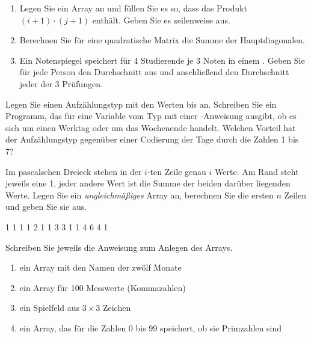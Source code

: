 \begin{enumerate}[label=\alph*)]
\item Legen Sie ein Array  an und füllen Sie es so, dass  das Produkt $(i+1) \cdot (j+1)$ enthält. Geben Sie es zeilenweise aus.
\item Berechnen Sie für eine quadratische Matrix die Summe der Hauptdiagonalen.
\item Ein Notenspiegel speichert für 4 Studierende je 3 Noten in einem . Geben Sie für jede Person den Durchschnitt aus und anschließend den Durchschnitt jeder der 3 Prüfungen.
\end{enumerate}

Legen Sie einen Aufzählungstyp  mit den Werten  bis  an. Schreiben Sie ein Programm, das für eine Variable vom Typ  mit einer -Anweisung ausgibt, ob es sich um einen Werktag oder um das Wochenende handelt. Welchen Vorteil hat der Aufzählungstyp gegenüber einer Codierung der Tage durch die Zahlen 1 bis 7?

Im pascalschen Dreieck stehen in der $i$-ten Zeile genau $i$ Werte. Am Rand steht jeweils eine 1, jeder andere Wert ist die Summe der beiden darüber liegenden Werte. Legen Sie ein \emph{ungleichmäßiges} Array  an, berechnen Sie die ersten $n$ Zeilen und geben Sie sie aus.
\begin{konsole}
1
1 1
1 2 1
1 3 3 1
1 4 6 4 1
\end{konsole}

\ueben
{}
Schreiben Sie jeweils die Anweisung zum Anlegen des Arrays.
\begin{enumerate}[label=\alph*)]
\item ein Array mit den Namen der zwölf Monate
\item ein Array für 100 Messwerte (Kommazahlen)
\item ein Spielfeld aus $3 \times 3$ Zeichen
\item ein Array, das für die Zahlen 0 bis 99 speichert, ob sie Primzahlen sind
\end{enumerate}

